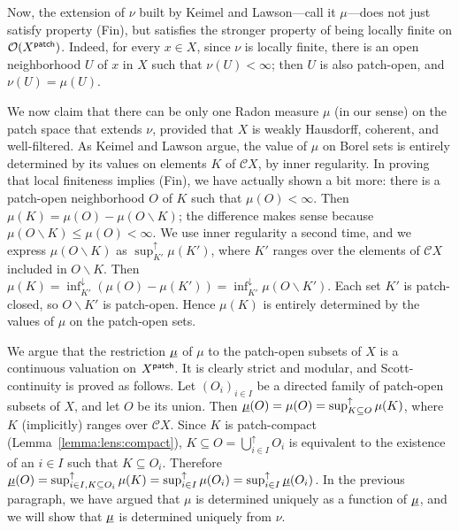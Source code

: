 \documentclass[preprint,12pt]{elsarticle}
\newcommand\diff{\smallsetminus}
\newcommand\Open{{\mathcal O}}
\newcommand\patch{{\text{\textsf{patch}}}}
\newcommand\dsup{\sup\nolimits^{\scriptstyle\uparrow}}
\newcommand\finf{\inf\nolimits^{\scriptstyle\downarrow}}
\newcommand\dcup{\bigcup\nolimits^{\scriptstyle\uparrow}}
\begin{document}
Now, the extension of $\nu$ built by Keimel and Lawson---call it
$\mu$---does not just satisfy property (Fin), but satisfies the
stronger property of being locally finite on $\Open {(X^\patch)}$.
Indeed, for every $x \in X$, since $\nu$ is locally finite, there is
an open neighborhood $U$ of $x$ in $X$ such that $\nu (U) < \infty$;
then $U$ is also patch-open, and $\nu (U) = \mu (U)$.


We now claim that there can be only one Radon measure $\mu$ (in our
sense) on the patch space that extends $\nu$, provided that $X$ is
weakly Hausdorff, coherent, and well-filtered.  As Keimel and Lawson
argue, the value of $\mu$ on Borel sets is entirely determined by its
values on elements $K$ of $\mathcal C X$, by inner regularity.  In
proving that local finiteness implies (Fin), we have actually shown a
bit more: there is a patch-open neighborhood $O$ of $K$ such that
$\mu (O) < \infty$.  Then $\mu (K) = \mu (O) - \mu (O \diff K)$; the
difference makes sense because
$\mu (O \diff K) \leq \mu (O) < \infty$.  We use inner regularity a
second time, and we express $\mu (O \diff K)$ as
$\dsup_{K'} \mu (K')$, where $K'$ ranges over the elements of
$\mathcal C X$ included in $O \diff K$.  Then
$\mu (K) = \finf_{K'} (\mu (O) - \mu (K')) = \finf_{K'} \mu (O \diff
K')$.  Each set $K'$ is patch-closed, so $O \diff K'$ is patch-open.
Hence $\mu (K)$ is entirely determined by the values of $\mu$ on the
patch-open sets.

We argue that the restriction $\underline{\smash\mu}$ of $\mu$ to the
patch-open subsets of $X$ is a continuous valuation on $X^\patch$.  It
is clearly strict and modular, and Scott-continuity is proved as
follows.  Let ${(O_i)}_{i \in I}$ be a directed family of patch-open
subsets of $X$, and let $O$ be its union.  Then
$\underline{\smash\mu} (O) = \mu (O) = \dsup_{K \subseteq O} \mu (K)$,
where $K$ (implicitly) ranges over $\mathcal C X$.  Since $K$ is
patch-compact (Lemma~\ref{lemma:lens:compact}),
$K \subseteq O = \dcup_{i \in I} O_i$ is equivalent to the existence
of an $i \in I$ such that $K \subseteq O_i$.  Therefore
$\underline{\smash\mu} (O) = \dsup_{i \in I, K \subseteq O_i} \mu (K)
= \dsup_{i \in I} \mu (O_i) = \dsup_{i \in I} \underline{\smash\mu}
(O_i)$.  In the previous paragraph, we have argued that $\mu$ is
determined uniquely as a function of $\underline{\smash\mu}$, and we
will show that $\underline{\smash\mu}$ is determined uniquely from
$\nu$.
\end{document}
